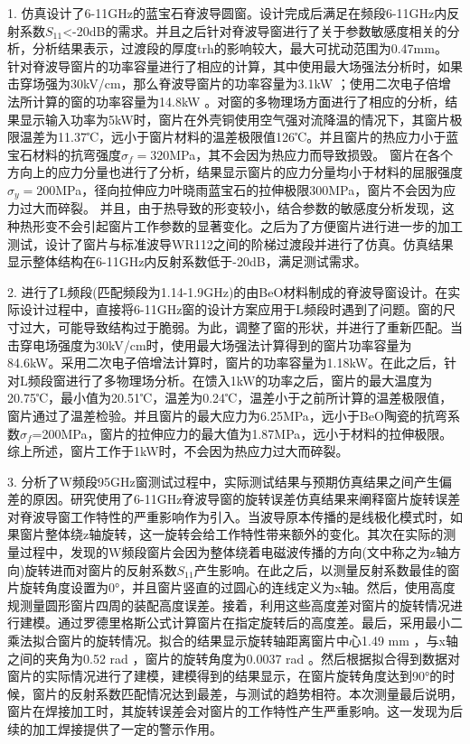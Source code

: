 \documentclass[master]{thesis-uestc}
\begin{document}
1. 仿真设计了6-11GHz的蓝宝石脊波导圆窗。设计完成后满足在频段6-11GHz内反射系数\(S_{11}\)<-20dB的需求。并且之后针对脊波导窗进行了关于参数敏感度相关的分析，分析结果表示，过渡段的厚度trh的影响较大，最大可扰动范围为0.47mm。
针对脊波导窗片的功率容量进行了相应的计算，其中使用最大场强法分析时，如果击穿场强为30kV/cm，那么脊波导窗片的功率容量为3.1kW ；使用二次电子倍增法所计算的窗的功率容量为14.8kW 。对窗的多物理场方面进行了相应的分析，结果显示输入功率为5kW时，窗片在外壳铜使用空气强对流降温的情况下，其窗片极限温差为11.37℃，远小于窗片材料的温差极限值126℃。并且窗片的热应力小于蓝宝石材料的抗弯强度\(\sigma_f = 320\)MPa，其不会因为热应力而导致损毁。
窗片在各个方向上的应力分量也进行了分析，结果显示窗片的应力分量均小于材料的屈服强度\(\sigma_y = 200\)MPa，径向拉伸应力叶晓雨蓝宝石的拉伸极限300MPa，窗片不会因为应力过大而碎裂。
并且，由于热导致的形变较小，结合参数的敏感度分析发现，这种热形变不会引起窗片工作参数的显著变化。之后为了方便窗片进行进一步的加工测试，设计了窗片与标准波导WR112之间的阶梯过渡段并进行了仿真。仿真结果显示整体结构在6-11GHz内反射系数低于-20dB，满足测试需求。

2. 进行了L频段(匹配频段为1.14-1.9GHz)的由BeO材料制成的脊波导窗设计。在实际设计过程中，直接将6-11GHz窗的设计方案应用于L频段时遇到了问题。窗的尺寸过大，可能导致结构过于脆弱。为此，调整了窗的形状，并进行了重新匹配。当击穿电场强度为30kV/cm时，使用最大场强法计算得到的窗片功率容量为84.6kW。采用二次电子倍增法计算时，窗片的功率容量为1.18kW。在此之后，针对L频段窗进行了多物理场分析。在馈入1kW的功率之后，窗片的最大温度为20.75℃，最小值为20.51℃，温差为0.24℃，温差小于之前所计算的温差极限值，窗片通过了温差检验。并且窗片的最大应力为6.25MPa，远小于BeO陶瓷的抗弯系数\(\sigma_f\)=200MPa，窗片的拉伸应力的最大值为1.87MPa，远小于材料的拉伸极限。综上所述，窗片工作于1kW时，不会因为热应力过大而碎裂。

3. 分析了W频段95GHz窗测试过程中，实际测试结果与预期仿真结果之间产生偏差的原因。研究使用了6-11GHz脊波导窗的旋转误差仿真结果来阐释窗片旋转误差对脊波导窗工作特性的严重影响作为引入。当波导原本传播的是线极化模式时，如果窗片整体绕z轴旋转，这一旋转会给工作特性带来额外的变化。其次在实际的测量过程中，发现的W频段窗片会因为整体绕着电磁波传播的方向(文中称之为z轴方向)旋转进而对窗片的反射系数\(S_{11}\)产生影响。在此之后，以测量反射系数最佳的窗片旋转角度设置为0°，并且窗片竖直的过圆心的连线定义为x轴。然后，使用高度规测量圆形窗片四周的装配高度误差。接着，利用这些高度差对窗片的旋转情况进行建模。通过罗德里格斯公式计算窗片在指定旋转后的高度差。最后，采用最小二乘法拟合窗片的旋转情况。拟合的结果显示旋转轴距离窗片中心1.49 mm ，与x轴之间的夹角为0.52 rad ，窗片的旋转角度为0.0037 rad 。然后根据拟合得到数据对窗片的实际情况进行了建模，建模得到的结果显示，在窗片旋转角度达到90°的时候，窗片的反射系数匹配情况达到最差，与测试的趋势相符。本次测量最后说明，窗片在焊接加工时，其旋转误差会对窗片的工作特性产生严重影响。这一发现为后续的加工焊接提供了一定的警示作用。
\end{document}
